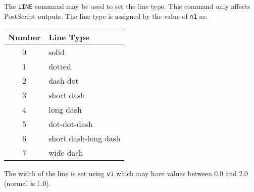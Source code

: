 \headb

The {\tt LINE} command may be used to set the line type.
This command only affects PostScript outputs.
The line type is assigned by the value of {\tt n1} as:

\begin{center}
\begin{tabular}{c | l }
 Number & Line Type \\ \hline
   0 &  solid \\
   1 &  dotted \\
   2 &  dash-dot \\
   3 &  short dash \\
   4 &  long dash \\
   5 &  dot-dot-dash \\
   6 &  short dash-long dash \\
   7 &  wide dash
\end{tabular}
\end{center}

The width of the line is set using {\tt v1} which may have values
between 0.0 and 2.0 (normal is 1.0).
\vfill
\eject

